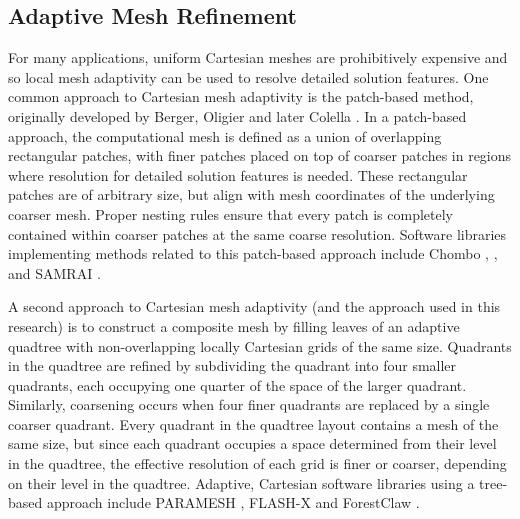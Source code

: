 \subsection{Adaptive Mesh Refinement}

For many applications, uniform Cartesian meshes are prohibitively expensive and so local mesh adaptivity can be used to resolve detailed solution features.  One common approach to Cartesian mesh adaptivity is the patch-based method, originally developed by Berger, Oligier and later Colella \citep{berger1989local,berger1984adaptive}. In a patch-based approach, the computational mesh is defined as a union of overlapping rectangular patches, with finer patches placed on top of coarser patches in regions where resolution for  detailed solution features is needed.  These rectangular patches are of arbitrary size, but align with mesh coordinates of the underlying coarser mesh. Proper nesting rules ensure that every patch is completely contained within coarser patches at the same coarse resolution. Software libraries implementing methods related to this patch-based approach include Chombo \citep{colella2009chombo}, \amrex \citep{zhang2019amrex}, and SAMRAI \citep{hornung2006managing}.

A second approach to Cartesian mesh adaptivity (and the approach used in this research) is to construct a composite mesh by filling leaves of an adaptive quadtree with non-overlapping locally Cartesian grids of the same size. Quadrants in the quadtree are refined by subdividing the quadrant into four smaller quadrants, each occupying one quarter of the space of the larger quadrant. Similarly, coarsening occurs when four finer quadrants are replaced by a single coarser quadrant.  Every quadrant in the quadtree layout contains a mesh of the same size, but since each quadrant occupies a space determined from their level in the quadtree, the effective resolution of each grid is finer or coarser, depending on their level in the quadtree.  Adaptive, Cartesian software libraries using a tree-based approach include PARAMESH \citep{globisch1995parmesh}, FLASH-X \citep{dubey2022flash} and ForestClaw \citep{calhoun2017forestclaw}.


